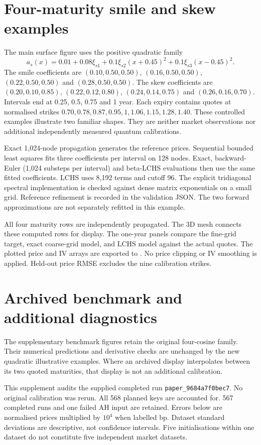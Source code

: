 \documentclass[10pt]{article}
\begin{document}
\section{Four-maturity smile and skew examples}
The main surface figure uses the positive quadratic family
\[
 a_s(x)=0.01+0.08\xi_{s1}+0.1\xi_{s2}(x+0.45)^2
                   +0.1\xi_{s3}(x-0.45)^2.
\]
The smile coefficients are $(0.10,0.50,0.50)$, $(0.16,0.50,0.50)$,
$(0.22,0.50,0.50)$ and $(0.28,0.50,0.50)$. The skew coefficients are
$(0.20,0.10,0.85)$, $(0.22,0.12,0.80)$, $(0.24,0.14,0.75)$ and
$(0.26,0.16,0.70)$. Intervals end at 0.25, 0.5, 0.75 and 1 year.
Each expiry contains quotes at normalised strikes
$0.70,0.78,0.87,0.95,1,1.06,1.15,1.28,1.40$.
These controlled examples illustrate two familiar shapes. They are neither
market observations nor additional independently measured quantum calibrations.

Exact 1,024-node propagation generates the reference prices. Sequential bounded
least squares fits three coefficients per interval on 128 nodes. Exact,
backward-Euler (1,024 substeps per interval) and beta-LCHS evaluations then use
the same fitted coefficients. LCHS uses 8,192 terms and cutoff 96. The explicit
tridiagonal spectral implementation is checked against dense matrix exponentials
on a small grid. Reference refinement is recorded in the validation JSON.
The two forward approximations are not separately refitted in this example.

All four maturity rows are independently propagated. The 3D mesh connects
these computed rows for display. The one-year panels compare the fine-grid
target, exact coarse-grid model, and LCHS model against the actual quotes.
The plotted price and IV arrays are exported to
. No price clipping or IV smoothing
is applied. Held-out price RMSE excludes the nine calibration strikes.

\section{Archived benchmark and additional diagnostics}
The supplementary benchmark figures retain the original four-cosine family.
Their numerical predictions and derivative checks are unchanged by the new
quadratic illustrative examples. Where an archived display interpolates between
its two quoted maturities, that display is not an additional calibration.

This supplement audits the supplied completed run \texttt{paper\_9684a7f0bec7}.
No original calibration was rerun. All 568 planned keys are accounted for.
567 completed runs and one failed AH input are retained. Errors below are
normalised prices multiplied by $10^4$ when labelled bp. Dataset standard
deviations are descriptive, not confidence intervals. Five initialisations
within one dataset do not constitute five independent market datasets.
\end{document}
